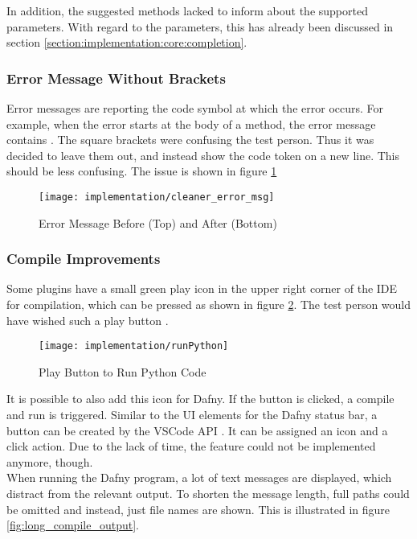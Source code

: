 In addition, the suggested methods lacked to inform about the supported parameters.
With regard to the parameters, this has already been discussed in section \ref{section:implementation:core:completion}. \\

\subsubsection{Error Message Without Brackets}
Error messages are reporting the code symbol at which the error occurs.
For example, when the error starts at the body of a method, the error message contains
.
The square brackets were confusing the test person.
Thus it was decided to leave them out, and instead show the code token on a new line.
This should be less confusing.
The issue is shown in figure \ref{fig:cleaner_error_msg}

\begin{figure}[H]
    \centering
    \texttt{[image: implementation/cleaner\_error\_msg]}
    \caption{Error Message Before (Top) and After (Bottom)}
    \label{fig:cleaner_error_msg}
\end{figure}

\subsubsection{Compile Improvements}
Some plugins have a small green play icon in the upper right corner of the IDE for compilation,
which can be pressed as shown in figure \ref{fig:runPython}.
The test person would have wished such a play button \cite{interview-remo}.

\begin{figure}[H]
    \centering
    \texttt{[image: implementation/runPython]}
    \caption{Play Button to Run Python Code}
    \label{fig:runPython}
\end{figure}

It is possible to also add this icon for Dafny. If the button is clicked, a compile and run is triggered.
Similar to the UI elements for the Dafny status bar,
a button can be created by the VSCode API \cite{vscodeAPI}.
It can be assigned an icon and a click action.
Due to the lack of time, the feature could not be implemented anymore, though.\\

When running the Dafny program,
a lot of text messages are displayed,
which distract from the relevant output.
To shorten the message length, full paths could be omitted and instead, just file names are shown.
This is illustrated in figure \ref{fig:long_compile_output}.

